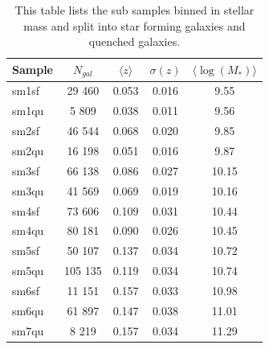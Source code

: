\documentclass[apj]{emulateapj}
\begin{document}
\begin{table}[h!]
\begin{center}
  \caption{\label{tab:tb2-3} This table lists the sub samples binned
    in stellar mass and split into star forming galaxies and quenched
    galaxies.}
\begin{tabular}{lcccc}
\hline
Sample & $N_{gal}$ & $\langle z \rangle $ & $\sigma(z)$ & $\langle \log(M_*) \rangle$\\
\hline
sm1sf   & 29 460  & 0.053  & 0.016  & 9.55   \\
sm1qu   & 5 809   & 0.038  & 0.011  & 9.56   \\
sm2sf   & 46 544  & 0.068  & 0.020  & 9.85   \\
sm2qu   & 16 198  & 0.051  & 0.016  & 9.87   \\
sm3sf   & 66 138  & 0.086  & 0.027  & 10.15  \\
sm3qu   & 41 569  & 0.069  & 0.019  & 10.16  \\
sm4sf   & 73 606  & 0.109  & 0.031  & 10.44  \\
sm4qu   & 80 181  & 0.090  & 0.026  & 10.45  \\
sm5sf   & 50 107  & 0.137  & 0.034  & 10.72  \\
sm5qu   & 105 135 & 0.119  & 0.034  & 10.74  \\
sm6sf   & 11 151  & 0.157  & 0.033  & 10.98  \\
sm6qu   & 61 897  & 0.147  & 0.038  & 11.01  \\
sm7qu   & 8 219   & 0.157  & 0.034  & 11.29  \\
\hline
\end{tabular}
\end{center}
\end{table}
\end{document}
